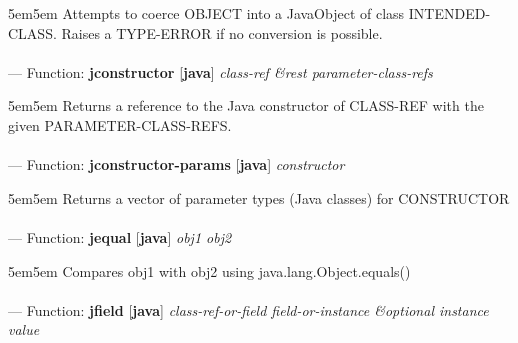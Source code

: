 \begin{adjustwidth}{5em}{5em}
Attempts to coerce OBJECT into a JavaObject of class INTENDED-CLASS.  Raises a TYPE-ERROR if no conversion is possible.
\end{adjustwidth}

\paragraph{}
\label{JAVA:JCONSTRUCTOR}
--- Function: \textbf{jconstructor} [\textbf{java}] \textit{class-ref \&rest parameter-class-refs}

\begin{adjustwidth}{5em}{5em}
Returns a reference to the Java constructor of CLASS-REF with the given PARAMETER-CLASS-REFS.
\end{adjustwidth}

\paragraph{}
\label{JAVA:JCONSTRUCTOR-PARAMS}
--- Function: \textbf{jconstructor-params} [\textbf{java}] \textit{constructor}

\begin{adjustwidth}{5em}{5em}
Returns a vector of parameter types (Java classes) for CONSTRUCTOR
\end{adjustwidth}

\paragraph{}
\label{JAVA:JEQUAL}
--- Function: \textbf{jequal} [\textbf{java}] \textit{obj1 obj2}

\begin{adjustwidth}{5em}{5em}
Compares obj1 with obj2 using java.lang.Object.equals()
\end{adjustwidth}

\paragraph{}
\label{JAVA:JFIELD}
--- Function: \textbf{jfield} [\textbf{java}] \textit{class-ref-or-field field-or-instance \&optional instance value}

